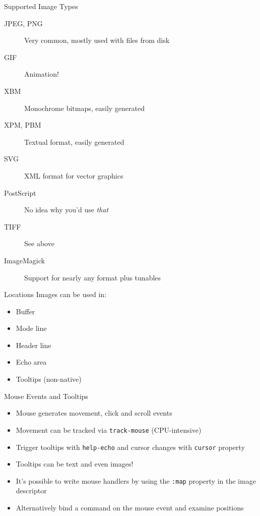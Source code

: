\documentclass[presentation]{beamer}
\begin{document}
\begin{frame}[label=sec-2-5]{Supported Image Types}
\begin{description}
\item[{JPEG, PNG}] Very common, mostly used with files from disk
\item[{GIF}] Animation!
\item[{XBM}] Monochrome bitmaps, easily generated
\item[{XPM, PBM}] Textual format, easily generated
\item[{SVG}] XML format for vector graphics
\item[{PostScript}] No idea why you'd use \emph{that}
\item[{TIFF}] See above
\item[{ImageMagick}] Support for nearly any format plus tunables
\end{description}
\end{frame}

\begin{frame}[label=sec-2-6]{Locations}
Images can be used in:
\begin{itemize}
\item Buffer
\item Mode line
\item Header line
\item Echo area
\item Tooltips (non-native)
\end{itemize}
\end{frame}

\begin{frame}[fragile,label=sec-2-7]{Mouse Events and Tooltips}
 \begin{itemize}
\item Mouse generates movement, click and scroll events
\item Movement can be tracked via \texttt{track-mouse} (CPU-intensive)
\item Trigger tooltips with \texttt{help-echo} and cursor changes with \texttt{cursor}
  property
\item Tooltips can be text and even images!
\item It's possible to write mouse handlers by using the \texttt{:map} property
in the image descriptor
\item Alternatively bind a command on the mouse event and examine
positions
\end{itemize}
\end{frame}
\end{document}
